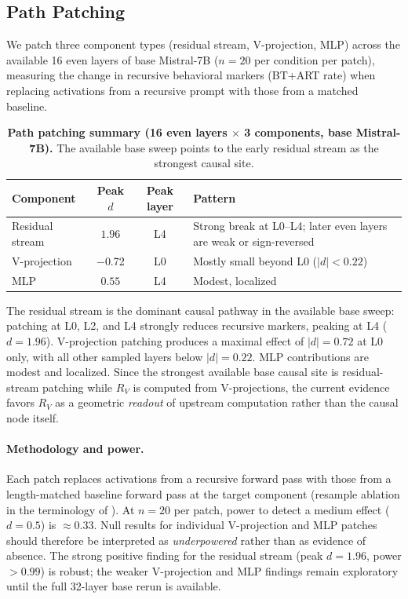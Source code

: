 \documentclass{article}
\newcommand{\RV}{R_V}
\newcommand{\dcohen}{d}
\begin{document}
\subsection{Path Patching}
\label{sec:pathpatch}

We patch three component types (residual stream, V-projection, MLP) across the available
16 even layers of base Mistral-7B ($n = 20$ per condition per patch), measuring the change in recursive behavioral
markers (BT+ART rate) when replacing activations from a recursive prompt with those from a
matched baseline.

\begin{table}[h]
\centering
\caption{\textbf{Path patching summary (16 even layers $\times$ 3 components, base Mistral-7B).}
         The available base sweep points to the early residual stream as the strongest causal site.}
\label{tab:pathpatch}
\smallskip
\begin{tabular}{lccl}
\toprule
\textbf{Component} & \textbf{Peak $\dcohen$} & \textbf{Peak layer} & \textbf{Pattern} \\
\midrule
Residual stream & $1.96$ & L4 & Strong break at L0--L4; later even layers are weak or sign-reversed \\
V-projection    & $-$0.72 & L0 & Mostly small beyond L0 ($|\dcohen| < 0.22$) \\
MLP             & $0.55$ & L4 & Modest, localized \\
\bottomrule
\end{tabular}
\end{table}

The residual stream is the dominant causal pathway in the available base sweep:
patching at L0, L2, and L4 strongly reduces recursive markers, peaking at L4
($\dcohen = 1.96$).
V-projection patching produces a maximal effect of $|\dcohen| = 0.72$ at L0 only,
with all other sampled layers below $|\dcohen| = 0.22$.
MLP contributions are modest and localized.
Since the strongest available base causal site is residual-stream patching while $\RV$ is computed
from V-projections, the current evidence favors $\RV$ as a geometric \emph{readout} of upstream
computation rather than the causal node itself.

\paragraph{Methodology and power.}
Each patch replaces activations from a recursive forward pass with those from a
length-matched baseline forward pass at the target component (resample ablation in the
terminology of \citet{heimersheim2024activation}).
At $n = 20$ per patch, power to detect a medium effect ($\dcohen = 0.5$) is ${\approx}0.33$.
Null results for individual V-projection and MLP patches should therefore be interpreted as
\emph{underpowered} rather than as evidence of absence.
The strong positive finding for the residual stream (peak $\dcohen = 1.96$, power $> 0.99$)
is robust; the weaker V-projection and MLP findings remain exploratory until the full
32-layer base rerun is available.
\end{document}
